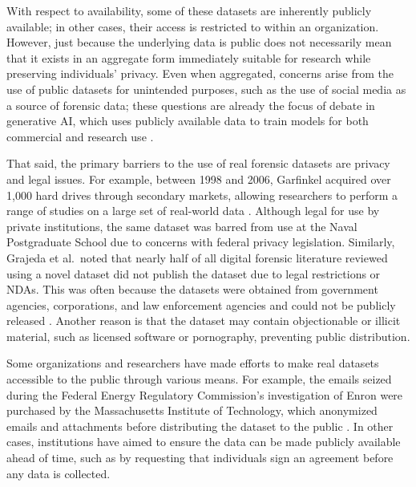 \documentclass[letterpaper,12pt]{report}
\begin{document}
With respect to availability, some of these datasets are inherently
publicly available; in other cases, their access is restricted to within
an organization. However, just because the underlying data is public
does not necessarily mean that it exists in an aggregate form
immediately suitable for research while preserving individuals' privacy.
Even when aggregated, concerns arise from the use of public datasets for
unintended purposes, such as the use of social media as a source of
forensic data; these questions are already the focus of debate in
generative AI, which uses publicly available data to train models for
both commercial and research use
\cite{avrahamiOwnershipCreativityGenerative2021,eshraghianHumanOwnershipArtificial2020,rooseAIgeneratedPictureWon2022}.

That said, the primary barriers to the use of real forensic datasets are
privacy and legal issues. For example, between 1998 and 2006, Garfinkel
acquired over 1,000 hard drives through secondary markets, allowing
researchers to perform a range of studies on a large set of real-world
data \cite{garfinkelForensicCorporaChallenge2007}. Although legal
for use by private institutions, the same dataset was barred from use at
the Naval Postgraduate School due to concerns with federal privacy
legislation. Similarly, Grajeda et al.~noted that nearly half of all
digital forensic literature reviewed using a novel dataset did not
publish the dataset due to legal restrictions or NDAs. This was often
because the datasets were obtained from government agencies,
corporations, and law enforcement agencies and could not be publicly
released \cite{grajedaAvailabilityDatasetsDigital2017}. Another
reason is that the dataset may contain objectionable or illicit
material, such as licensed software or pornography, preventing public
distribution.

Some organizations and researchers have made efforts to make real
datasets accessible to the public through various means. For example,
the emails seized during the Federal Energy Regulatory Commission's
investigation of Enron were purchased by the Massachusetts Institute of
Technology, which anonymized emails and attachments before distributing
the dataset to the public
\cite{yannikosDataCorporaDigital2014,garfinkelForensicCorporaChallenge2007}.
In other cases, institutions have aimed to ensure the data can be made
publicly available ahead of time, such as by requesting that individuals
sign an agreement before any data is collected.
\end{document}
